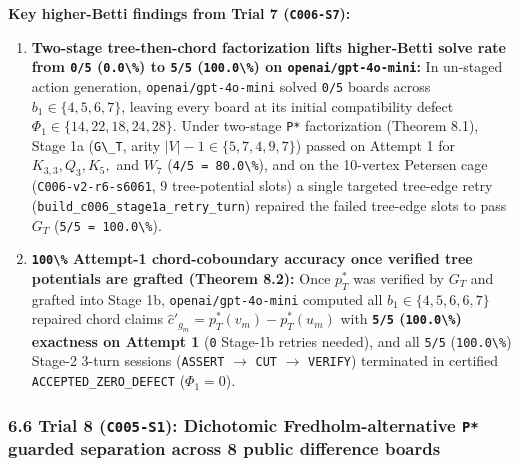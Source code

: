 \documentclass[
  11pt,
]{article}
\newcommand{\passthrough}[1]{#1}
\providecommand{\tightlist}{%
  \setlength{\itemsep}{0pt}\setlength{\parskip}{0pt}}
\begin{document}
\textbf{Key higher-Betti findings from Trial 7
(\passthrough{\lstinline!C006-S7!}):}

\begin{enumerate}
\def\labelenumi{\arabic{enumi}.}
\tightlist
\item
  \textbf{Two-stage tree-then-chord factorization lifts higher-Betti
  solve rate from \passthrough{\lstinline!0/5!}
  (\passthrough{\lstinline!0.0\%!}) to \passthrough{\lstinline!5/5!}
  (\passthrough{\lstinline!100.0\%!}) on
  \nolinkurl{openai/gpt-4o-mini}:} In un-staged action generation,
  \nolinkurl{openai/gpt-4o-mini} solved \passthrough{\lstinline!0/5!}
  boards across
  \(b_1 \in \{4,\allowbreak  5,\allowbreak  6,\allowbreak  7\}\),
  leaving every board at its initial compatibility defect
  \(\Phi_1 \in \{14,\allowbreak  22,\allowbreak  18,\allowbreak  24,\allowbreak  28\}\).
  Under two-stage \passthrough{\lstinline!P*!} factorization (Theorem
  8.1), Stage 1a (\passthrough{\lstinline!G\_T!}, arity
  \(|V|-1 \in \{5,\allowbreak  7,\allowbreak  4,\allowbreak  9,\allowbreak  7\}\))
  passed on Attempt 1 for
  \(K_{3,\allowbreak 3},\allowbreak  Q_3,\allowbreak  K_5,\allowbreak \)
  and \(W_7\) (\passthrough{\lstinline!4/5 = 80.0\%!}), and on the
  10-vertex Petersen cage (\nolinkurl{C006-v2-r6-s6061}, 9
  tree-potential slots) a single targeted tree-edge retry
  (\nolinkurl{build_c006_stage1a_retry_turn}) repaired the failed
  tree-edge slots to pass \(G_T\)
  (\passthrough{\lstinline!5/5 = 100.0\%!}).
\item
  \textbf{\passthrough{\lstinline!100\%!} Attempt-1 chord-coboundary
  accuracy once verified tree potentials are grafted (Theorem 8.2):}
  Once \(p_T^*\) was verified by \(G_T\) and grafted into Stage 1b,
  \nolinkurl{openai/gpt-4o-mini} computed all
  \(b_1 \in \{4,\allowbreak  5,\allowbreak  6,\allowbreak  6,\allowbreak  7\}\)
  repaired chord claims \(\hat{c}'_{g_m} = p_T^*(v_m) - p_T^*(u_m)\)
  with \textbf{\passthrough{\lstinline!5/5!}
  (\passthrough{\lstinline!100.0\%!}) exactness on Attempt 1}
  (\passthrough{\lstinline!0!} Stage-1b retries needed), and all
  \passthrough{\lstinline!5/5!} (\passthrough{\lstinline!100.0\%!})
  Stage-2 3-turn sessions (\passthrough{\lstinline!ASSERT!} \(\to\)
  \passthrough{\lstinline!CUT!} \(\to\)
  \passthrough{\lstinline!VERIFY!}) terminated in certified
  \nolinkurl{ACCEPTED_ZERO_DEFECT} (\(\Phi_1 = 0\)).
\end{enumerate}

\subsubsection{\texorpdfstring{6.6 Trial 8 (\texttt{C005-S1}):
Dichotomic Fredholm-alternative \texttt{P*} guarded separation across 8
public difference
boards}{6.6 Trial 8 (C005-S1): Dichotomic Fredholm-alternative P* guarded separation across 8 public difference boards}}\label{trial-8-c005-s1-dichotomic-fredholm-alternative-p-guarded-separation-across-8-public-difference-boards}
\end{document}
